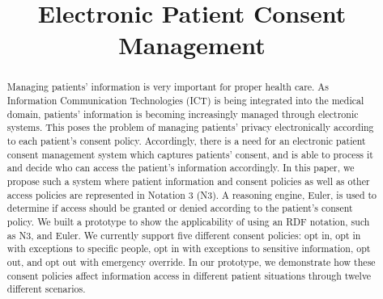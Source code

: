 \documentclass[conference]{IEEEtran}
\begin{document}
\title{Electronic Patient Consent Management}

\author{
}

\maketitle


\begin{abstract}
Managing patients' information is very important for proper health care. As Information Communication Technologies (ICT) is being integrated into the medical
domain, patients' information is becoming increasingly managed through electronic systems. This poses the problem of managing patients' privacy
electronically according to each patient's consent policy. Accordingly, there is a need for an electronic patient consent management
system which captures patients' consent, and is able to process it and decide who can access the patient's information accordingly. In this paper, we propose
such a system where patient information and consent policies as well as other access policies are represented in Notation 3 (N3). A reasoning engine,
Euler, is used to determine if access should be granted or denied according to the patient's consent policy. We built a prototype to show the applicability of
using an RDF notation, such as N3, and Euler. We currently support five different consent policies: opt in, opt in with exceptions to specific people, opt in
with exceptions to sensitive information, opt out, and opt out with emergency override. In our prototype, we demonstrate how these consent policies affect
information access in different patient situations through twelve different scenarios.
\end{abstract}
\end{document}
